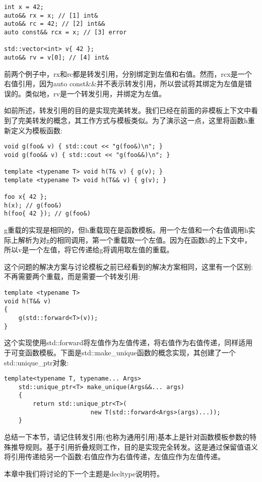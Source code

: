 \begin{lstlisting}[style=styleCXX]
int x = 42;
auto&& rx = x; // [1] int&
auto&& rc = 42; // [2] int&&
auto const&& rcx = x; // [3] error

std::vector<int> v{ 42 };
auto&& rv = v[0]; // [4] int&
\end{lstlisting}

前两个例子中，rx和rc都是转发引用，分别绑定到左值和右值。然而，rcx是一个右值引用，因为auto const\&\&并不表示转发引用，所以尝试将其绑定为左值是错误的。类似地，rv是一个转发引用，并绑定为左值。

如前所述，转发引用的目的是实现完美转发。我们已经在前面的非模板上下文中看到了完美转发的概念，其工作方式与模板类似。为了演示这一点，这里将函数h重新定义为模板函数:

\begin{lstlisting}[style=styleCXX]
void g(foo& v) { std::cout << "g(foo&)\n"; }
void g(foo&& v) { std::cout << "g(foo&&)\n"; }

template <typename T> void h(T& v) { g(v); }
template <typename T> void h(T&& v) { g(v); }

foo x{ 42 };
h(x); // g(foo&)
h(foo{ 42 }); // g(foo&)
\end{lstlisting}

g重载的实现是相同的，但h重载现在是函数模板。用一个左值和一个右值调用h实际上解析为对g的相同调用，第一个重载取一个左值。因为在函数h的上下文中，所以v是一个左值，将它传递给g将调用取左值的重载。

这个问题的解决方案与讨论模板之前已经看到的解决方案相同，这里有一个区别:不再需要两个重载，而是需要一个转发引用:

\begin{lstlisting}[style=styleCXX]
template <typename T>
void h(T&& v)
{
	g(std::forward<T>(v));
}
\end{lstlisting}

这个实现使用std::forward将左值作为左值传递，将右值作为右值传递，同样适用于可变函数模板。下面是std::make\_unique函数的概念实现，其创建了一个std::unique\_ptr对象:

\begin{lstlisting}[style=styleCXX]
	template<typename T, typename... Args>
	std::unique_ptr<T> make_unique(Args&&... args)
	{
		return std::unique_ptr<T>(
						new T(std::forward<Args>(args)...));
	}
\end{lstlisting}

总结一下本节，请记住转发引用(也称为通用引用)基本上是针对函数模板参数的特殊推导规则。基于引用折叠规则工作，目的是实现完全转发。这是通过保留值语义将引用传递给另一个函数:右值应作为右值传递，左值应作为左值传递。

本章中我们将讨论的下一个主题是decltype说明符。













